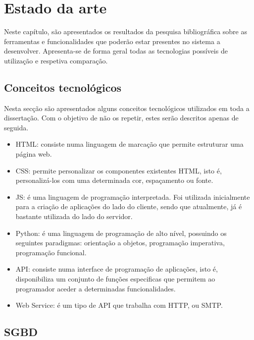 \chapter{Estado da arte}
\label{state}


Neste capítulo, são apresentados os resultados da pesquisa bibliográfica sobre as ferramentas e funcionalidades que poderão estar presentes no sistema a desenvolver. Apresenta-se de forma geral todas as tecnologias possíveis de utilização e respetiva comparação. 






\section{Conceitos tecnológicos}


Nesta secção são apresentados alguns conceitos tecnológicos utilizados em toda a dissertação. Com o objetivo de não os repetir, estes serão descritos apenas de seguida. 

\begin{itemize}
	\item \ac{HTML}: consiste numa linguagem de marcação que permite estruturar uma página web. 
	\item \ac{CSS}: permite personalizar os componentes existentes \ac{HTML}, isto é, personalizá-los com uma determinada cor, espaçamento ou fonte. 
	\item \ac{JS}: é uma linguagem de programação interpretada. Foi utilizada inicialmente para a criação de aplicações do lado do cliente, sendo que atualmente, já é bastante utilizada do lado do servidor. 
	
	\item Python: é uma  linguagem de programação de alto nível, possuindo os seguintes paradigmas:  orientação a objetos, programação imperativa, programação funcional. 
	
	
	\item \ac{API}: consiste numa interface de programação de aplicações, isto é, disponibiliza um conjunto de funções especificas que permitem ao programador aceder a determinadas funcionalidades.  
	
	\item Web Service: é um tipo de \ac{API} que trabalha com \ac{HTTP},
	ou \ac{SMTP}.
	
	
\end{itemize}



\section{\acl{SGBD}}

